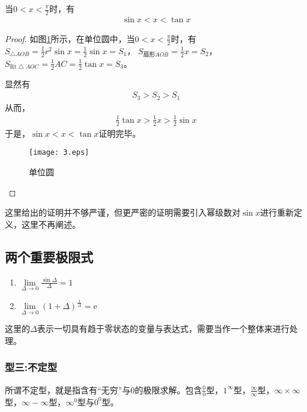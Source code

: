     当$ 0<x<\displaystyle\frac{\pi}{2} $时，有
    \begin{align*}
        \sin x<x<\tan x
    \end{align*}
        \begin{proof}
        如图\ref{dwy}所示，在单位圆中，当$ 0<x<\displaystyle\frac{\pi}{2}$时，有
        $S_{\bigtriangleup AOB}=\displaystyle\frac{1}{2}r^2 \sin x=\displaystyle\frac{1}{2}\sin x=S_1$， 
        $S_{\text{扇形} AOB}=\displaystyle\frac{1}{2}x=S_2$， 
        $S_{\mathrm{Rt} \bigtriangleup AOC}=\displaystyle\frac{1}{2}AC=\displaystyle\frac{1}{2}\tan x=S_3$。
        
        显然有
        \begin{align*}
            S_3>S_2>S_1
        \end{align*}
        从而，
        \begin{align*}
            \frac{1}{2}\tan x>\frac{1}{2}x>\frac{1}{2}\sin x
        \end{align*}
        于是，$\sin x<x<\tan x$证明完毕。
        \begin{figure}[htbp]
            \centering
            \texttt{[image: 3.eps]}
            \caption{单位圆}
            \label{dwy}
          \end{figure}
        \end{proof}
        \begin{note}
            这里给出的证明并不够严谨，但更严密的证明需要引入幂级数对$\sin x$进行重新定义，这里不再阐述。
        \end{note}
        
        \subsection{两个重要极限式}
        \begin{enumerate}
            \item $\lim\limits_{\Delta \to 0} \frac{\sin \Delta}{\Delta}=1$
            \item $\lim\limits_{\Delta \to 0} (1+\Delta)^{\frac{1}{\Delta}}=\mathrm{e}$
        \end{enumerate}
        \begin{note}
            这里的$\Delta$表示一切具有趋于零状态的变量与表达式，需要当作一个整体来进行处理。
        \end{note}

        \subsubsection*{型三:不定型}
        所谓不定型，就是指含有“无穷”与0的极限求解。包含$ 
        \frac{0}{0} $型，$ 1^{\infty} $型，$ 
        \frac{\infty}{\infty} $型，$ 
        \infty \times \infty $型，$ 
        \infty - \infty $型，$ 
        \infty^{0} $型与$0^{0} $型。


